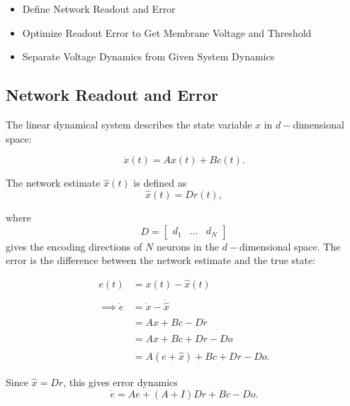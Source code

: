 \documentclass{article}
\begin{document}
\begin{itemize}
\item Define Network Readout and Error

\item Optimize Readout Error to Get Membrane Voltage and Threshold

\item Separate Voltage Dynamics from Given System Dynamics
\end{itemize}

\subsection{Network Readout and Error}
The linear dynamical system describes the state variable $x$ in $d-$dimensional space:

\begin{equation}
\label{eq:x_hat}
\dot{x}(t) = Ax(t) + Bc(t).
\end{equation}


The network estimate $\hat{x}(t)$ is defined as
\begin{equation}
\hat{x}(t) = D r(t),
\end{equation}

where 
\begin{equation}
D = \begin{bmatrix}
d_1 & \ldots & d_N
\end{bmatrix}
\end{equation}
gives the encoding directions of $N$ neurons in the $d-$dimensional space. 
The error is the difference between the network estimate and the true state:

\begin{align*}
e(t) &= x(t) - \hat{x}(t)
\\
\\
\implies
\dot{e} &= \dot{x} - \dot{\hat{x}}
\\
\\
&= 
Ax + Bc - D \dot{r}
\\
\\
&=
Ax + Bc + Dr - Do
\\
\\
&=
A(e + \hat{x}) + Bc + Dr - Do.
\end{align*}

Since $\hat{x} = Dr$, this gives error dynamics
\begin{equation}
\dot{e}
=
Ae + (A + I)Dr + Bc - Do.
\label{eq:error_dynamics}
\end{equation}
\end{document}
